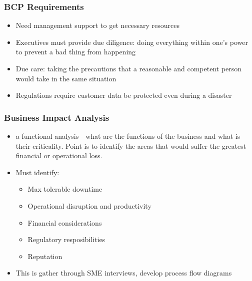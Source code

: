 \documentclass[11pt]{article}
\begin{document}
\subsubsection{BCP Requirements}
\label{sec:org5168ac3}
\begin{itemize}
\item Need management support to get necessary resources
\item Executives must provide due diligence: doing everything within one's power to prevent a bad thing from happening
\item Due care: taking the precautions that a reasonable and competent person would take in the same situation
\item Regulations require customer data be protected even during a disaster
\end{itemize}
\subsubsection{Business Impact Analysis}
\label{sec:org2ab2ea0}
\begin{itemize}
\item a functional analysis - what are the functions of the business and what is their criticality. Point is to identify the areas that would suffer the greatest financial or operational loss.
\item Must identify:
\begin{itemize}
\item Max tolerable downtime
\item Operational disruption and productivity
\item Financial considerations
\item Regulatory resposibilities
\item Reputation
\end{itemize}
\item This is gather through SME interviews, develop process flow diagrams
\end{itemize}
\end{document}
